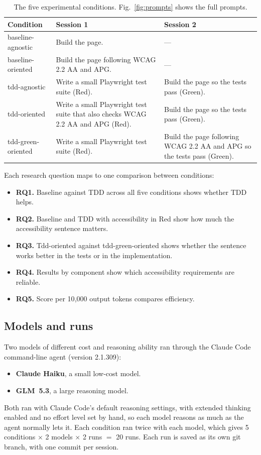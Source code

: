 \documentclass[conference]{IEEEtran}
\begin{document}
\begin{table}[t]
  \centering
  \caption{The five experimental conditions. Fig.~\ref{fig:prompts} shows the full prompts.}
  \label{tab:conditions}
  \begin{tabularx}{\textwidth}{l X X}
    \hline
    \textbf{Condition} & \textbf{Session 1} & \textbf{Session 2} \\
    \hline
    baseline-agnostic & Build the page. & --- \\
    baseline-oriented & Build the page following WCAG 2.2 AA and APG. & --- \\
    tdd-agnostic & Write a small Playwright test suite (Red). & Build the page so the tests pass (Green). \\
    tdd-oriented & Write a small Playwright test suite that also checks WCAG 2.2 AA and APG (Red). & Build the page so the tests pass (Green). \\
    tdd-green-oriented & Write a small Playwright test suite (Red). & Build the page following WCAG 2.2 AA and APG so the tests pass (Green). \\
    \hline
  \end{tabularx}
\end{table}

Each research question maps to one comparison between conditions:
\begin{itemize}
  \item \textbf{RQ1.} Baseline against TDD across all five conditions shows whether TDD helps.
  \item \textbf{RQ2.} Baseline and TDD with accessibility in Red show how much the accessibility sentence matters.
  \item \textbf{RQ3.} Tdd-oriented against tdd-green-oriented shows whether the sentence works better in the tests or in the implementation.
  \item \textbf{RQ4.} Results by component show which accessibility requirements are reliable.
  \item \textbf{RQ5.} Score per 10{,}000 output tokens compares efficiency.
\end{itemize}

\subsection{Models and runs}

Two models of different cost and reasoning ability ran through the Claude Code command-line agent (version 2.1.309):
\begin{itemize}
  \item \textbf{Claude Haiku}, a small low-cost model.
  \item \textbf{GLM~5.3}, a large reasoning model.
\end{itemize}
Both ran with Claude Code's default reasoning settings, with extended thinking enabled and no effort level set by hand, so each model reasons as much as the agent normally lets it. Each condition ran twice with each model, which gives 5 conditions $\times$ 2 models $\times$ 2 runs $=$ 20 runs. Each run is saved as its own git branch, with one commit per session.
\end{document}

